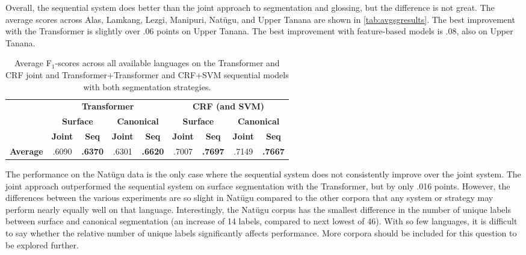 Overall, the sequential system does better than the joint approach to segmentation and glossing, but the difference is not great. The average scores across Alas, Lamkang, Lezgi, Manipuri, Nat\"ugu, and Upper Tanana are shown in \autoref{tab:avgsgresults}. The best improvement with the Transformer is slightly over .06 points on Upper Tanana. The best improvement with feature-based models is .08, also on Upper Tanana. 

\begin{table}[!tb]
    \centering
    \begin{tabular}{l|cc|cc|cc|cc}
          & \multicolumn{4}{c|}{\textbf{Transformer}} & \multicolumn{4}{c}{\textbf{CRF (and SVM)}} 
          \\
          & \multicolumn{2}{c|}{\textbf{Surface}} & \multicolumn{2}{c|}{\textbf{Canonical}}  & \multicolumn{2}{c|}{\textbf{Surface}} & \multicolumn{2}{c}{\textbf{Canonical}} 
          \\
          &  \textbf{Joint} & \textbf{Seq} &  \textbf{Joint} & \textbf{Seq} &  \textbf{Joint} & \textbf{Seq} &  \textbf{Joint} & \textbf{Seq} \\
         \hline
         \textbf{Average} & .6090 & \textbf{.6370} & .6301 & \textbf{.6620} 
                 & .7007 & \textbf{.7697} & .7149 & \textbf{.7667} \\
    \end{tabular}
    \caption[Average Results of All Joint and Sequential models]{Average F$_1$-scores across all available languages on the Transformer and CRF joint and Transformer+Transformer and CRF+SVM sequential models with both segmentation strategies.}
    \label{tab:avgsgresults}
\end{table}

The performance on the Nat\"ugu data is the only case where the sequential system does not consistently improve over the joint system. The joint approach outperformed the sequential system on surface segmentation with the Transformer, but by only .016 points. However, the differences between the various experiments are so slight in Nat\"ugu compared to the other corpora that any system or strategy may perform nearly equally well on that language. Interestingly, the Nat\"ugu corpus has the smallest difference in the number of unique labels between surface and canonical segmentation (an increase of 14 labels, compared to next lowest of 46). With so few languages, it is difficult to say whether the relative number of unique labels significantly affects performance. More corpora should be included for this question to be explored further. 
 


